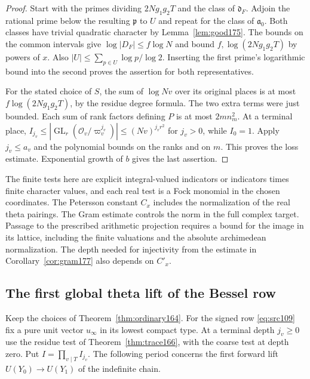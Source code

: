 \documentclass[a4paper,11pt]{article}
\theoremstyle{definition}
\theoremstyle{remark}
\numberwithin{equation}{section}
\newcommand{\GL}{\operatorname{GL}}
\newcommand{\OO}{\mathcal O}
\begin{document}
\begin{proof}
Start with the primes dividing \(2Ng_1g_2T\) and the class
of \(\mathfrak d_F\). Adjoin the rational prime below the
resulting \(\mathfrak p\) to \(U\) and repeat for the class of
\(\mathfrak a_0\). Both classes have trivial quadratic
character by Lemma~\ref{lem:good175}. The bounds on the
common intervals give \(\log |D_F|\le f\log N\) and bound
\(f,\log(2Ng_1g_2T)\) by powers of \(x\). Also
\(|U|\le \sum_{p\in U}\log p/\log 2\). Inserting the first
prime's logarithmic bound into the second proves the
assertion for both representatives.

For the stated choice of \(S\), the sum of \(\log Nv\)
over its original places is at most \(f\log(2Ng_1g_2T)\),
by the residue degree formula. The two extra terms were just
bounded. Each sum of rank factors defining \(P\) is at most
\(2m n_m^2\). At a terminal place,
\(I_{j_v}\le |\GL_r(\OO_v/\varpi_v^{j_v})|\le (Nv)^{j_vr^2}\)
for \(j_v>0\), while \(I_0=1\). Apply \(j_v\le a_v\) and
the polynomial bounds on the ranks and on \(m\). This proves
the loss estimate. Exponential growth of \(b\) gives the
last assertion.
\end{proof}

The finite tests here are explicit integral-valued indicators
or indicators times finite character values, and each real
test is a Fock monomial in the chosen coordinates. The
Petersson constant \(C_x\) includes the normalization of
the real theta pairings. The Gram estimate controls the norm in the full complex
target. Passage to the prescribed arithmetic projection requires
a bound for the image in its lattice, including the finite
valuations and the absolute archimedean normalization.
The depth needed for injectivity from the estimate in
Corollary~\ref{cor:gram177} also depends on \(C'_x\).

\subsection{The first global theta lift of the Bessel row}\label{nav:VIII-17}
Keep the choices of Theorem~\ref{thm:ordinary164}. For the
signed row \eqref{eq:src109} fix a pure unit vector \(u_\infty\)
in its lowest compact type. At a terminal depth \(j_v\ge0\)
use the residue test of Theorem~\ref{thm:trace166}, with the
coarse test at depth zero. Put \(I=\prod_{v\mid T}I_{j_v}\).
The following period concerns the first forward lift
\(U(Y_0)\to U(Y_1)\) of the indefinite chain.
\end{document}
